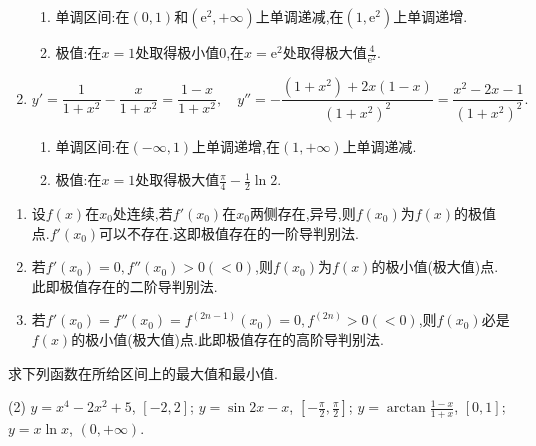 \begin{solution}
\begin{enumerate}
\begin{enumerate}
                  \item[] 单调区间:在$(0,1)$和$(\mathrm{e}^2,+\infty)$上单调递减,在$(1,\mathrm{e}^2)$上单调递增.
                  \item[] 极值:在$x = 1$处取得极小值$0$,在$x = \mathrm{e}^2$处取得极大值$\frac{4}{\mathrm{e}^2}$.
              \end{enumerate}
        \item $$y' = \frac{1}{1+x^2} - \frac{x}{1+x^2} = \frac{1 - x}{1 + x^2}, \quad y'' = -\frac{(1+x^2) + 2x(1 - x)}{(1+x^2)^2} = \frac{x^2 - 2x - 1}{(1+x^2)^2}.$$
              \begin{enumerate}
                  \item[] 单调区间:在$(-\infty,1)$上单调递增,在$(1,+\infty)$上单调递减.
                  \item[] 极值:在$x = 1$处取得极大值$\frac{\pi}{4} - \frac{1}{2}\ln 2$.
              \end{enumerate}
    \end{enumerate}
\end{solution}

\begin{proposition*}[极值点的判别法] \quad
    \begin{enumerate}
        \item 设$f(x)$在$x_0$处连续,若$f'(x_0)$在$x_0$两侧存在,异号,则$f(x_0)$为$f(x)$的极值点.$f'(x_0)$可以不存在.这即极值存在的一阶导判别法.
        \item 若$f'(x_0) = 0, f''(x_0) > 0(<0)$,则$f(x_0)$为$f(x)$的极小值(极大值)点.此即极值存在的二阶导判别法.
        \item 若$f'(x_0) = f''(x_0) = f^{(2n-1)}(x_0) = 0, f^{(2n)} >0 (<0)$,则$f(x_0)$必是$f(x)$的极小值(极大值)点.此即极值存在的高阶导判别法.
    \end{enumerate}
\end{proposition*}

\begin{exercise}[3.3.22]
    求下列函数在所给区间上的最大值和最小值.
    \begin{tasks}[label=(\arabic*)](2)
        \task $y = x^4 - 2x^2+5$, $[ -2, 2]$;
        \task $y = \sin 2x - x$, $[-\frac{\pi}{2}, \frac{\pi}{2}]$;
        \task $y = \arctan\frac{1-x}{1+x}$, $[0,1]$;
        \task $y = x\ln x$, $(0, +\infty)$.
    \end{tasks}
\end{exercise}

